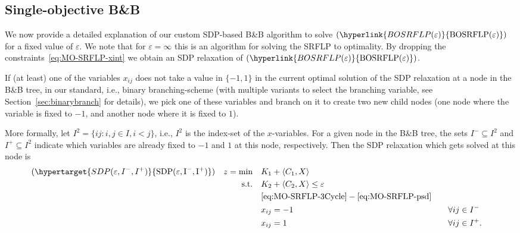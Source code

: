 \documentclass{article}
\newcommand{\mytag}[1]{(\hypertarget{#1}{\mathrm{#1}})}
\newcommand{\myrefmath}[1]{(\hyperlink{#1}{\mathrm{#1}})}
\newcommand{\BB}{B\&B\xspace}
\newcommand{\SRFLP}{SRFLP\xspace}
\begin{document}
\subsection{Single-objective \BB}\label{sec:SO-BB}
We now provide a detailed explanation of our custom SDP-based \BB algorithm to solve $\myrefmath{BOSRFLP(\varepsilon)}$ for a fixed value of $\varepsilon$.
We note that for $\varepsilon=\infty$ this is an algorithm for solving the \SRFLP to optimality.
By dropping the constraints~\eqref{eq:MO-SRFLP-xint} we obtain an SDP relaxation of $\myrefmath{BOSRFLP(\varepsilon)}$. 

If (at least) one of the variables $x_{ij}$ does not take a value in $\{-1,1\}$ in the current optimal solution of the SDP relaxation at a node in the \BB tree, in our standard, i.e., binary branching-scheme (with multiple variants to select the branching variable, see Section~\ref{sec:binarybranch} for details), we pick one of these variables and branch on it to create two new child nodes (one node where the variable is fixed to $-1$, and another node where it is fixed to $1$). 

More formally, let $I^2=\{ ij: i,j \in I, i<j\}$, i.e., $I^2$ is the index-set of the $x$-variables. 
For a given node in the \BB tree, the sets $I^-\subseteq I^2$ and $I^+\subseteq I^2$ indicate which variables are already fixed to $-1$ and $1$ at this node, respectively.
Then the SDP relaxation which gets solved at this node is
\begin{subequations}
\label{eq:SDP_eps_node}
    \begin{align}
        \mytag{SDP(\varepsilon,I^-,I^+)} \quad z = \min \quad &K_1 +\langle C_1,X \rangle \label{eq:BOR-obj}\\
        \text{s.t.} \quad & K_2 + \langle C_2, X \rangle \leq \varepsilon \label{eq:BOR-eps} \\ 
        & \eqref{eq:MO-SRFLP-3Cycle}-\eqref{eq:MO-SRFLP-psd} \\
        &x_{ij}=-1 &\quad&\forall ij \in I^- \label{eq:BOR-down} \\
        &x_{ij}=1 &&\forall ij \in I^+ \label{eq:BOR-rest}.
    \end{align}
\end{subequations}
\end{document}
